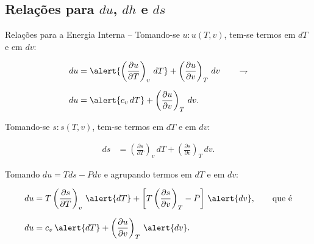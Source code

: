 \subsection{Relações para $du$, $dh$ e $ds$}

    \begin{frame}[allowframebreaks]{Relações para a Energia Interna --}\vspace*{-0em}
        Tomando-se \alert{$u\!:\!u(T, v)$}, tem-se termos em \alert{$dT$} e em \alert{$dv$}:

        \begin{align*}
            du  &= 
                \alert{\left(\frac{\partial u}{\partial T}\right)_v\,dT} +
                \left(\frac{\partial u}{\partial v}\right)_T\,dv
            \qquad\rightharpoondown
            \\[\medskipamount]
            du  &=
                \alert{c_v\,dT} +
                \left(\frac{\partial u}{\partial v}\right)_T\,dv.
        \end{align*}

        Tomando-se \alert{$s\!:\!s(T, v)$}, tem-se termos em \alert{$dT$} e em \alert{$dv$}:

        \begin{align*}
            ds  &= 
                \left(\frac{\partial s}{\partial T}\right)_v\,dT +
                \left(\frac{\partial s}{\partial v}\right)_T\,dv.
        \end{align*}

        \pagebreak
        Tomando \alert{$du = Tds - Pdv$} e agrupando termos em \alert{$dT$} e em \alert{$dv$}:

        \begin{align*}
            du  &=
                T\left(\frac{\partial s}{\partial T}\right)_v\,\alert{dT} +
                \left[
                    T\left(\frac{\partial s}{\partial v}\right)_T - P
                \right]\,\alert{dv},
            \qquad\mbox{que é}
            \\[\medskipamount]
            du  &=
                c_v\,\alert{dT} +
                \left(\frac{\partial u}{\partial v}\right)_T\,\alert{dv}.
        \end{align*}


\end{frame}
